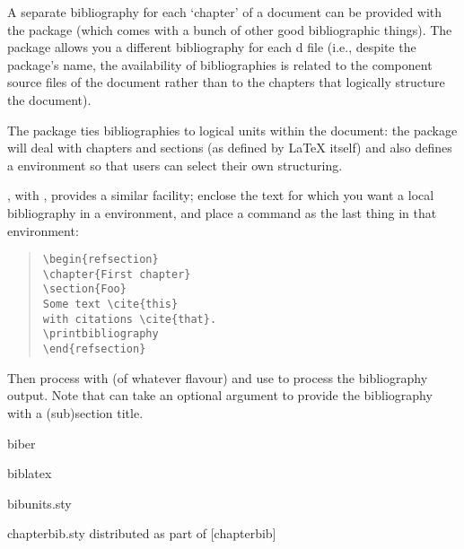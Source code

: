 
A separate bibliography for each `chapter' of a document can be provided
with the package  (which comes with a bunch of
other good bibliographic things).  The package allows you a
different bibliography for each d file (i.e., despite the
package's name, the availability of bibliographies is related to the
component source files of the document rather than to the chapters that
logically structure the document).

The package  ties bibliographies to logical units
within the document: the package will deal with chapters and sections
(as defined by \LaTeX{} itself) and also defines a 
environment so that users can select their own structuring.

, with
, provides a similar facility; enclose the text for
which you want a local bibliography in a 
environment, and place a  command as the last
thing in that environment:
\begin{quote}
\begin{verbatim}
\begin{refsection}
\chapter{First chapter}
\section{Foo}
Some text \cite{this}
with citations \cite{that}.
\printbibliography
\end{refsection}
\end{verbatim}
\end{quote}
Then process with \latex{} (of whatever flavour) and use
 to process the bibliography output.  Note that
 can take an optional argument
 to provide the bibliography with a
(sub)section title.
\begin{ctanrefs}
\item[biber]
\item[biblatex]
\item[bibunits.sty]
\item[chapterbib.sty]distributed as part of [chapterbib]
\end{ctanrefs}


